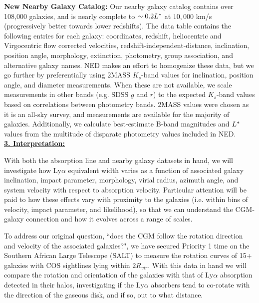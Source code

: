 \documentclass[12pt]{article}
\begin{document}
\textbf{New Nearby Galaxy Catalog:} Our nearby galaxy catalog contains over 108,000 galaxies, and is nearly complete to $\sim0.2 L^{\**}$ at $10,000$ km/s (progressively better towards lower redshifts). The data table contains the following entries for each galaxy: coordinates, redshift, heliocentric and Virgocentric flow corrected velocities, redshift-independent-distance, inclination, position angle, morphology, extinction, photometry, group association, and alternative galaxy names. NED makes an effort to homogenize these data, but we go further by preferentially using 2MASS $K_s$-band values for inclination, position angle, and diameter measurements. When these are not available, we scale measurements in other bands (e.g. SDSS $g$ and $r$) to the expected $K_s$-band values based on correlations between photometry bands. 2MASS values were chosen as it is an all-sky survey, and measurements are available for the majority of galaxies. Additionally, we calculate best-estimate B-band magnitudes and $L^{\**}$ values from the multitude of disparate photometry values included in NED. \\


\noindent \textbf{\underline{3. Interpretation:}}

With both the absorption line and nearby galaxy datasets in hand, we will investigate how Ly$\alpha$ equivalent width varies as a function of associated galaxy inclination, impact parameter, morphology, virial radius, azimuth angle, and system velocity with respect to absorption velocity. Particular attention will be paid to how these effects vary with proximity to the galaxies (i.e. within bins of velocity,  impact parameter, and likelihood), so that we can understand the CGM-galaxy connection and how it evolves across a range of scales. 

To address our original question, ``does the CGM follow the rotation direction and velocity of the associated galaxies?", we have secured Priority 1 time on the Southern African Large Telescope (SALT) to measure the rotation curves of 15+ galaxies with COS sightlines lying within $2R_{vir}$. With this data in hand we will compare the rotation and orientation of the galaxies with that of Ly$\alpha$ absorption detected in their halos, investigating if the Ly$\alpha$ absorbers tend to co-rotate with the direction of the gaseous disk, and if so, out to what distance.
\end{document}
